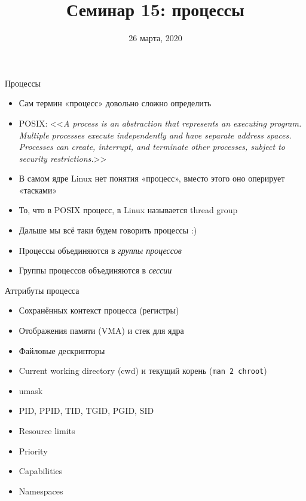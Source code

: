 \documentclass[10pt,pdf,hyperref={unicode}]{beamer}
\title{Семинар 15: процессы}
\date{26 марта, 2020}
\begin{document}
\begin{frame}
  \titlepage
\end{frame}

\begin{frame}{Процессы}
\begin{itemize}
    \item Сам термин «процесс» довольно сложно определить
    \item POSIX: <<\emph{A process is an abstraction that represents an executing program. Multiple processes execute independently and have separate address spaces. Processes can create, interrupt, and terminate other processes, subject to security restrictions.}>>
    \item В самом ядре Linux нет понятия «процесс», вместо этого оно оперирует «тасками»
    \item То, что в POSIX процесс, в Linux называется thread group
    \item Дальше мы всё таки будем говорить процессы :)
    \item Процессы объединяются в \emph{группы процессов}
    \item Группы процессов объединяются в \emph{сессии}
\end{itemize}
\end{frame}

\begin{frame}{Аттрибуты процесса}
\begin{itemize}
    \item Сохранённых контекст процесса (регистры)
    \item Отображения памяти (VMA) и стек для ядра
    \item Файловые дескрипторы
    \item Current working directory (cwd) и текущий корень (\texttt{man 2 chroot})
    \item umask
    \item PID, PPID, TID, TGID, PGID, SID
    \item Resource limits
    \item Priority
    \item Capabilities
    \item Namespaces
\end{itemize}
\end{frame}
\end{document}
